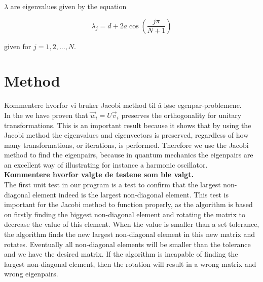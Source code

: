 \documentclass{article}
\begin{document}
$\lambda$ are eigenvalues given by the equation

\begin{equation}  \label{eq:eigenvalues}
    \lambda_j = d + 2a \cos \left( \frac{j \pi }{N + 1} \right)
\end{equation}

given for $ j = 1, 2, ..., N$. \\





\vspace{1cm}

\section{Method} \label{sec:Method}

Kommentere hvorfor vi bruker Jacobi method til å løse egenpar-problemene. \\

In the  we have proven that $\vec{w}_i = U \vec{v}_i$ preserves the orthogonality for unitary transformations. This is an important result because it shows that by using the Jacobi method the eigenvalues and eigenvectors is preserved, regardless of how many transformations, or iterations, is performed. Therefore we use the Jacobi method to find the eigenpairs, because in quantum mechanics the eigenpairs are an excellent way of illustrating for instance a harmonic oscillator. \\

\textbf{Kommentere hvorfor valgte de testene som ble valgt.} \\

The first unit test in our program is a test to confirm that the largest non-diagonal element indeed is the largest non-diagonal element. This test is important for the Jacobi method to function properly, as the algorithm is based on firstly finding the biggest non-diagonal element and rotating the matrix to decrease the value of this element. When the value is smaller than a set tolerance, the algorithm finds the new largest non-diagonal element in this new matrix and rotates. Eventually all non-diagonal elements will be smaller than the tolerance and we have the desired matrix. If the algorithm is incapable of finding the largest non-diagonal element, then the rotation will result in a wrong matrix and wrong eigenpairs. \\
\end{document}
